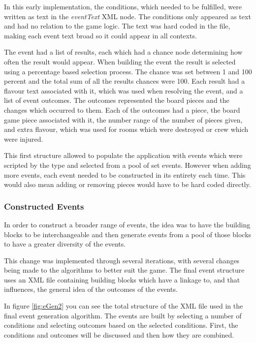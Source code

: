 In this early implementation, the conditions, which needed to be fulfilled, were written as text in the \textit{eventText} XML node. The conditions only appeared as text and had no relation to the game logic. The text was hard coded in the file, making each event text broad so it could appear in all contexts.

The event had a list of results, each which had a chance node determining how often the result would appear. When building the event the result is selected using a percentage based selection process. The chance was set between 1 and 100 percent and the total sum of all the results chances were 100. 
Each result had a flavour text associated with it, which was used when resolving the event, and a list of event outcomes. 
The outcomes represented the board pieces and the changes which occurred to them. Each of the outcomes had a piece, the board game piece associated with it, the number range of the number of pieces given, and extra flavour, which was used for rooms which were destroyed or crew which were injured.

This first structure allowed to populate the application with events which were scripted by the type and selected from a pool of set events. 
However when adding more events, each event needed to be constructed in its entirety each time. This would also mean adding or removing pieces would have to be hard coded directly. 

\subsubsection{Constructed Events}
\label{sec:eventGeneration}
In order to construct a broader range of events, the idea was to have the building blocks to be interchangeable and then generate events from a pool of those blocks to have a greater diversity of the events.

This change was implemented through several iterations, with several changes being made to the algorithms to better suit the game. The final event structure uses an XML file containing building blocks which have a linkage to, and that influences, the general idea of the outcomes of the events.

In figure \ref{fig:eGen2} you can see the total structure of the XML file used in the final event generation algorithm. 
The events are built by selecting a number of conditions and selecting outcomes based on the selected conditions. 
First, the conditions and outcomes will be discussed and then how they are combined.

